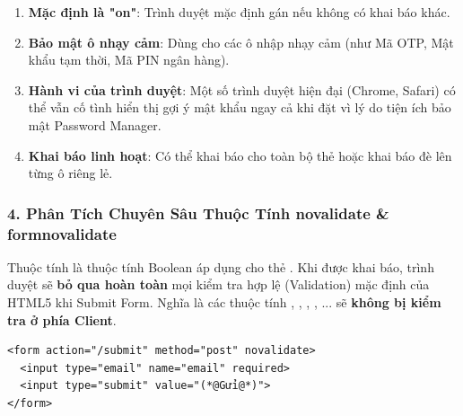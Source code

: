 \begin{tipBox}
\begin{enumerate}[leftmargin=1.5em, itemsep=4pt, parsep=0pt]
    \item \textbf{Mặc định là "on"}: Trình duyệt mặc định gán  nếu không có khai báo khác.
    \item \textbf{Bảo mật ô nhạy cảm}: Dùng  cho các ô nhập nhạy cảm (như Mã OTP, Mật khẩu tạm thời, Mã PIN ngân hàng).
    \item \textbf{Hành vi của trình duyệt}: Một số trình duyệt hiện đại (Chrome, Safari) có thể vẫn cố tình hiển thị gợi ý mật khẩu ngay cả khi đặt  vì lý do tiện ích bảo mật Password Manager.
    \item \textbf{Khai báo linh hoạt}: Có thể khai báo  cho toàn bộ thẻ  hoặc khai báo đè lên từng ô  riêng lẻ.
\end{enumerate}
\end{tipBox}

\subsubsection{4. Phân Tích Chuyên Sâu Thuộc Tính novalidate \& formnovalidate}

\begin{conceptBox}
Thuộc tính  là thuộc tính Boolean áp dụng cho thẻ . Khi được khai báo, trình duyệt sẽ \textbf{bỏ qua hoàn toàn} mọi kiểm tra hợp lệ (Validation) mặc định của HTML5 khi Submit Form. Nghĩa là các thuộc tính , , , , ... sẽ \textbf{không bị kiểm tra ở phía Client}.
\end{conceptBox}

\begin{codeWindow}
\begin{lstlisting}[language=HTML5]
<form action="/submit" method="post" novalidate>
  <input type="email" name="email" required>
  <input type="submit" value="(*@Gửi@*)">
</form>
\end{lstlisting}
\end{codeWindow}

